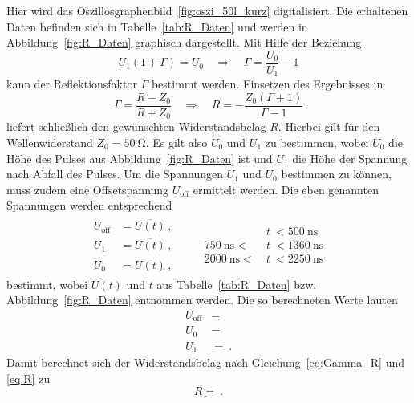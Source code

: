 Hier wird das Oszillosgraphenbild~\ref{fig:oszi_50l_kurz} digitalisiert.
Die erhaltenen Daten befinden sich in Tabelle~\ref{tab:R_Daten} und werden
in Abbildung~\ref{fig:R_Daten} graphisch dargestellt.
Mit Hilfe der Beziehung
\begin{equation}
  U_1 (1 + \Gamma) = U_0 \quad \Rightarrow \quad \Gamma = \frac{U_0}{U_1} - 1
  \label{eq:Gamma_R}
\end{equation}
kann der Reflektionsfaktor $\Gamma$ bestimmt werden. Einsetzen des Ergebnisses
in
\begin{equation}
  \Gamma = \frac{R-Z_0}{R+Z_0} \quad \Rightarrow \quad
  R = - \frac{Z_0(\Gamma + 1)}{\Gamma - 1}
  \label{eq:R}
\end{equation}
liefert schließlich den gewünschten Widerstandsbelag $R$.
Hierbei gilt für den Wellenwiderstand $Z_0 = \SI{50}{\ohm}$.
Es gilt also $U_0$ und $U_1$ zu bestimmen, wobei $U_0$ die Höhe des Pulses aus
Abbildung~\ref{fig:R_Daten} ist und $U_1$ die Höhe der Spannung nach Abfall des
Pulses. Um die Spannungen $U_1$ und $U_0$ bestimmen zu können, muss zudem eine
Offsetspannung $U_\text{off}$ ermittelt werden.
Die eben genannten Spannungen werden entsprechend
\begin{align}
  \begin{aligned}
    U_\text{off} &= \overline{U(t)}\,, \\
    U_1          &= \overline{U(t)}\,, \\
    U_0          &= \overline{U(t)}\,,
  \end{aligned}
  \qquad
  \begin{aligned}
    &t~< \SI{500}{\nano\second} \\
    \SI{750}{\nano\second}  <~&t~< \SI{1360}{\nano\second} \\
    \SI{2000}{\nano\second} <~&t~< \SI{2250}{\nano\second}
  \end{aligned}
\end{align}
bestimmt, wobei $U(t)$ und $t$ aus Tabelle~\ref{tab:R_Daten} bzw.
Abbildung~\ref{fig:R_Daten} entnommen werden.
Die so berechneten Werte lauten
\begin{align}
  U_\text{off} &=  \\
  U_0 &=  \\
  U_1 &= ~.
\end{align}
Damit berechnet sich der Widerstandsbelag nach Gleichung~\eqref{eq:Gamma_R} und
\eqref{eq:R} zu
\begin{equation}
  \underline{R = }~.
\end{equation}

